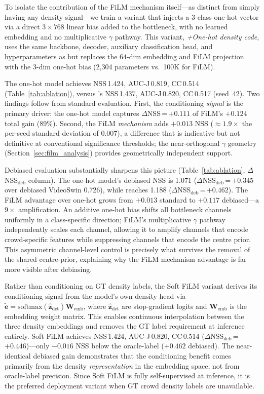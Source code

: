 \documentclass[twocolumn]{article}
\begin{document}
To isolate the contribution of the FiLM mechanism itself---as distinct from
simply having any density signal---we train a variant that injects a 3-class
one-hot vector via a direct $3\!\times\!768$ linear bias added to the
bottleneck, with no learned embedding and no multiplicative $\gamma$ pathway.
This variant, \textit{+One-hot density code}, uses the same backbone,
decoder, auxiliary classification head, and hyperparameters as \ourmodel{}
but replaces the $64$-dim embedding and FiLM projection with the 3-dim
one-hot bias (2,304 parameters vs.\ 100K for FiLM).

The one-hot model achieves NSS\,1.424, AUC-J\,0.819, CC\,0.514
(Table~\ref{tab:ablation}), versus \ourmodel's NSS\,1.437, AUC-J\,0.820,
CC\,0.517 (seed~42).  Two findings follow from standard evaluation.
First, the conditioning \emph{signal} is the primary driver: the one-hot model
captures $\Delta$NSS\,=\,$+0.111$ of FiLM's $+0.124$ total gain (89\%).
Second, the FiLM \emph{mechanism} adds $+0.013$ NSS
(${\approx}1.9\times$ the per-seed standard deviation of $0.007$),
a difference that is indicative but not definitive at conventional
significance thresholds; the near-orthogonal $\gamma$ geometry
(Section~\ref{sec:film_analysis}) provides geometrically independent support.

Debiased evaluation substantially sharpens this picture
(Table~\ref{tab:ablation}, $\Delta$NSS$_\text{deb}$ column).
The one-hot model's debiased NSS is 1.071 ($\Delta$NSS$_\text{deb}$\,=\,$+0.345$
over debiased VideoSwin 0.726), while \ourmodel{} reaches 1.188
($\Delta$NSS$_\text{deb}$\,=\,$+0.462$).  The FiLM advantage over one-hot
grows from $+0.013$ standard to $+0.117$ debiased---a $9\times$ amplification.
An additive one-hot bias shifts all bottleneck channels uniformly in a
class-specific direction; FiLM's multiplicative $\gamma$ pathway independently
scales each channel, allowing it to amplify channels that encode crowd-specific
features while suppressing channels that encode the centre prior.
This asymmetric channel-level control is precisely what survives the removal
of the shared centre-prior, explaining why the FiLM mechanism advantage is
far more visible after debiasing.

Rather than conditioning on GT density labels, the Soft FiLM variant derives
its conditioning signal from the model's own density head via
$\tilde{\mathbf{e}} = \text{softmax}(\hat{\mathbf{z}}_\text{det}) \mathbf{W}_\text{emb}$,
where $\hat{\mathbf{z}}_\text{det}$ are stop-gradient logits and
$\mathbf{W}_\text{emb}$ is the embedding weight matrix.
This enables continuous interpolation between the three density embeddings
and removes the GT label requirement at inference entirely.
Soft FiLM achieves NSS\,1.424, AUC-J\,0.820, CC\,0.514
($\Delta$NSS$_\text{deb}$\,=\,$+0.446$)---only $-0.016$ NSS below the oracle-label
\ourmodel{} ($+0.462$ debiased).  The near-identical debiased gain
demonstrates that the conditioning benefit comes primarily from the density
\emph{representation} in the embedding space, not from oracle-label precision.
Since Soft FiLM is fully self-supervised at inference, it is the preferred
deployment variant when GT crowd density labels are unavailable.
\end{document}
